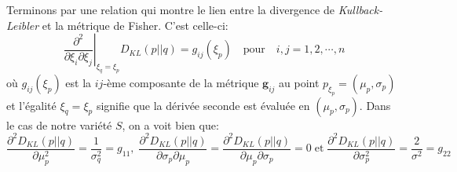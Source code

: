 \documentclass[11pt, letterpaper]{article}
\begin{document}
	Terminons par une relation qui montre le lien entre la divergence de \textit{Kullback-Leibler} et la métrique de Fisher. C'est celle-ci:
	\begin{equation*}
	    \left.\frac{\partial^2}{\partial\xi_i\partial\xi_j}\right|_{\xi_q=\xi_p}D_{KL}(p||q)=g_{ij}(\xi_p)\quad\text{pour}\quad i,j=1,2, \cdots, n
	\end{equation*}
	où $g_{ij}(\xi_p)$ est la $ij$-ème composante de la métrique $\textbf{g}_{ij}$ au point $p_{\xi_p}=(\mu_p, \sigma_p)$ et l'égalité $\xi_q=\xi_p$ signifie que la dérivée seconde est évaluée en $(\mu_p, \sigma_p)$. Dans le cas de notre variété $S$, on a voit bien que:
	\begin{equation*}
	    \frac{\partial^2D_{KL}(p||q)}{\partial\mu_p^2}=\frac{1}{\sigma_q^2}=g_{11},\;\frac{\partial^2D_{KL}(p||q)}{\partial\sigma_p\partial\mu_p}=\frac{\partial^2D_{KL}(p||q)}{\partial\mu_p\partial\sigma_p}=0\;\text{et}\;\frac{\partial^2D_{KL}(p||q)}{\partial\sigma_p^2}=\frac{2}{\sigma^2}=g_{22}
	\end{equation*}\\\\
	
	
	\renewcommand{\refname}{Références et bibliographie}
	
		
\end{document}
